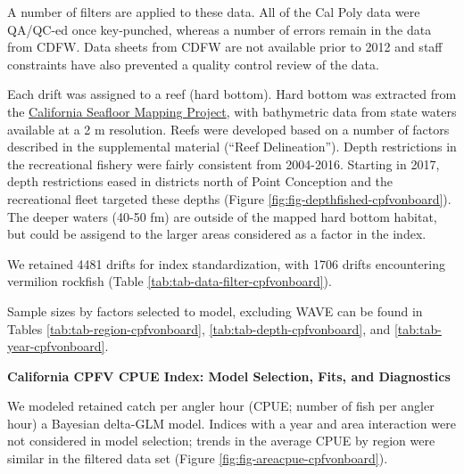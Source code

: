 \documentclass[11pt,
  english,
]{article}
\begin{document}
A number of filters are applied to these data. All of the Cal Poly data were QA/QC-ed once key-punched, whereas a number of errors remain in the data from CDFW. Data sheets from CDFW are not available prior to 2012 and staff constraints have also prevented a quality control review of the data.

Each drift was assigned to a reef (hard bottom). Hard bottom was extracted from the {\href{http://seafloor.otterlabs.org/index.html}{California Seafloor Mapping Project}\leavevmode\tagmcend\tagstructend}, with bathymetric data from state waters available at a 2 m resolution. Reefs were developed based on a number of factors described in the supplemental material (``Reef Delineation''). Depth restrictions in the recreational fishery were fairly consistent from 2004-2016. Starting in 2017, depth restrictions eased in districts north of Point Conception and the recreational fleet targeted these depths (Figure \ref{fig:fig-depthfished-cpfvonboard}). The deeper waters (40-50 fm) are outside of the mapped hard bottom habitat, but could be assigend to the larger areas considered as a factor in the index.

We retained 4481 drifts for index standardization, with 1706 drifts encountering vermilion rockfish (Table \ref{tab:tab-data-filter-cpfvonboard}).

Sample sizes by factors selected to model, excluding WAVE can be found in Tables \ref{tab:tab-region-cpfvonboard}, \ref{tab:tab-depth-cpfvonboard}, and \ref{tab:tab-year-cpfvonboard}.

\textbf{California CPFV CPUE Index: Model Selection, Fits, and Diagnostics}

We modeled retained catch per angler hour (CPUE; number of fish per angler hour) a Bayesian delta-GLM model. Indices with a year and area interaction were not considered in model selection; trends in the average CPUE by region were similar in the filtered data set (Figure \ref{fig:fig-areacpue-cpfvonboard}).
\end{document}
